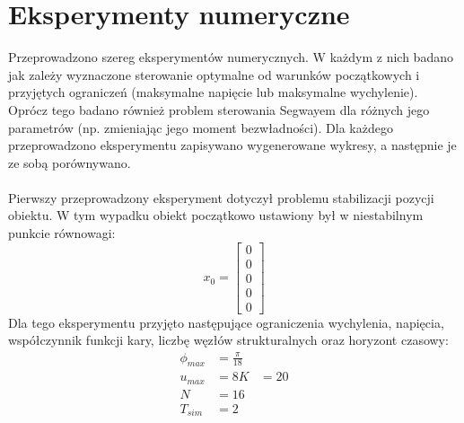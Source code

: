 \section{Eksperymenty numeryczne}
\label{eksperymenty_numeryczne}

Przeprowadzono szereg eksperymentów numerycznych. W każdym z nich badano jak zależy wyznaczone sterowanie optymalne od warunków początkowych i przyjętych ograniczeń (maksymalne napięcie lub maksymalne wychylenie). Oprócz tego badano również problem sterowania Segwayem dla różnych jego parametrów (np. zmieniając jego moment bezwładności). Dla każdego przeprowadzono eksperymentu zapisywano wygenerowane wykresy, a następnie je ze sobą porównywano.
\paragraph*{}
Pierwszy przeprowadzony eksperyment dotyczył problemu stabilizacji pozycji obiektu. W tym wypadku obiekt początkowo ustawiony był w niestabilnym punkcie równowagi:
\begin{equation}
x_0=\begin{bmatrix}
0\\
0\\
0\\
0\\
0
\end{bmatrix}
\end{equation}
Dla tego eksperymentu przyjęto następujące ograniczenia wychylenia, napięcia, współczynnik funkcji kary, liczbę węzłów strukturalnych oraz horyzont czasowy:
\begin{equation}
\begin{aligned}
\phi_{max}&=\frac{\pi}{18}\\
u_{max}&=8
K&=20\\
N&=16\\
T_{sim}&=2
\end{aligned}
\end{equation}

